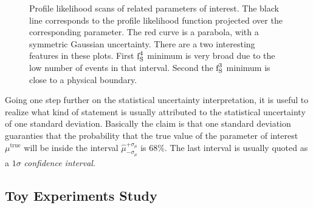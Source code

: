 \begin{figure}[!t]
  \begin{subfigure}{0.5\textwidth}
    \raggedright
    \scalebox{0.56}{}
    \caption{}
    \label{nll_ASMag2_bin3}
  \end{subfigure}%
  \hfill%
  \begin{subfigure}{0.5\textwidth}
    \raggedleft
    \scalebox{0.56}{}
    \caption{}
    \label{nll_ASPhase_bin3}
  \end{subfigure}
  \begin{subfigure}{0.5\textwidth}
    \raggedright
    \scalebox{0.56}{}
    \caption{}
    \label{nll_ASMag2_bin4}
  \end{subfigure}%
  \hfill%
  \begin{subfigure}{0.5\textwidth}
    \raggedleft
    \scalebox{0.56}{}
    \caption{}
    \label{nll_ASPhase_bin4}
  \end{subfigure}
\caption{Profile likelihood scans of \swave related parameters of interest. The black line corresponds to the profile likelihood
         function projected over the corresponding parameter. The red curve is a parabola, with a symmetric Gaussian
         uncertainty. There are a two interesting features in these plots. First $\text{f}_{\text{S}}^{4}$ minimum is very broad due to the
         low number of events in that \mkpi interval. Second the $\text{f}_{\text{S}}^{3}$ minimum is close to a physical boundary.}
\end{figure}

Going one step further on the statistical uncertainty interpretation, it is useful to realize what kind of statement is usually
attributed to the statistical uncertainty of one standard deviation. Basically the claim is that one standard deviation
guaranties that the probability that the true value of the parameter of interest $\mu^{\text{true}}$ will be inside the
interval $\hat{\mu}_{-\sigma_\mu}^{+\sigma_\mu}$ is $68\%$. The last interval is usually quoted as a $1\sigma$ {\it confidence interval}.





\subsection{Toy Experiments Study}
\label{Toy_Experiments_Study}

